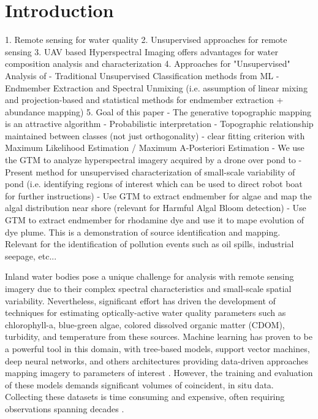\documentclass{article}
\begin{document}
\section{Introduction}



1. Remote sensing for water quality
2. Unsupervised approaches for remote sensing
3. UAV based Hyperspectral Imaging offers advantages for water composition analysis and characterization
4. Approaches for "Unsupervised" Analysis of 
    - Traditional Unsupervised Classification methods from ML
    - Endmember Extraction and Spectral Unmixing (i.e. assumption of linear mixing and projection-based and statistical methods for endmember extraction + abundance mapping)
5. Goal of this paper
    - The generative topographic mapping is an attractive algorithm 
        - Probabilistic interpretation
        - Topographic relationship maintained between classes (not just orthogonality)
        - clear fitting criterion with Maximum Likelihood Estimation / Maximum A-Posteriori Estimation
    - We use the GTM to analyze hyperspectral imagery acquired by a drone over pond to 
        - Present method for unsupervised characterization of small-scale variability of pond (i.e. identifying regions of interest which can be used to direct robot boat for further instructions) 
        - Use GTM to extract endmember for algae and map the algal distribution near shore (relevant for Harmful Algal Bloom detection)
        - Use GTM to extract endmember for rhodamine dye and use it to mape evolution of dye plume. This is a demonstration of source identification and mapping. Relevant for the identification of pollution events such as oil spills, industrial seepage, etc...



Inland water bodies pose a unique challenge for analysis with remote sensing imagery due to their complex spectral characteristics and small-scale spatial variability. Nevertheless, significant effort has driven the development of techniques for estimating optically-active water quality parameters such as chlorophyll-a, blue-green algae, colored dissolved organic matter (CDOM), turbidity, and temperature from these sources\cite{koponen2002lake,ritchie2003remote, bonansea2015using}. Machine learning has proven to be a powerful tool in this domain, with tree-based models, support vector machines, deep neural networks, and others architectures providing data-driven approaches mapping imagery to parameters of interest \cite{thenkabail2018hyperspectral, ghatkar2019classification,sagan2020monitoring}. However, the training and evaluation of these models demands significant volumes of coincident, in situ data. Collecting these datasets is time consuming and expensive, often requiring observations spanning decades \cite{aurin2018remote, ross2019aquasat}. 
\end{document}
